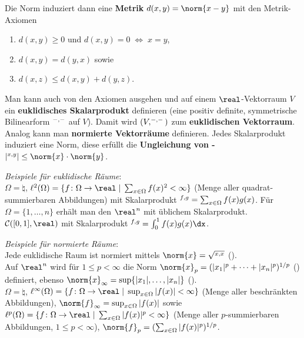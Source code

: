 Die Norm induziert dann eine \textbf{Metrik} $d(x, y) = \norm{x - y}$ mit den
Metrik-Axiomen
\begin{enumerate}[label=(M\arabic*)]
    \item
    $d(x, y) \ge 0$ und $d(x, y) = 0 \;\Leftrightarrow\; x = y$,

    \item
    $d(x, y) = d(y, x)$ sowie

    \item
    $d(x, z) \le d(x, y) + d(y, z)$.
\end{enumerate}

Man kann auch von den Axiomen ausgehen und auf einem $\real$-Vektorraum $V$ ein
\textbf{euklidisches Skalarprodukt} definieren
(eine positiv definite, symmetrische Bilinearform $\sp{-, -}$ auf $V$).
Damit wird $(V, \sp{-, -})$ zum \textbf{euklidischen Vektorraum}. \\
Analog kann man \textbf{normierte Vektorräume} definieren. Jedes Skalarprodukt
induziert eine Norm, diese erfüllt die
\textbf{Ungleichung von -}
$|\sp{x, y}| \le \norm{x} \cdot \norm{y}$.

\emph{Beispiele für euklidische Räume}: \\
$\Omega = \natural$,
$\ell^2(\Omega) = \{f\colon \Omega \rightarrow \real \;|\;
\sum_{x \in \Omega} f(x)^2 < \infty\}$
(Menge aller quadrat-summierbaren Abbildungen)
mit Skalarprodukt
$\sp{f, g} = \sum_{x \in \Omega} f(x)g(x)$.
Für $\Omega = \{1, \dotsc, n\}$ erhält man den
$\real^n$ mit üblichem Skalarprodukt. \\
$\C([0,1], \real)$ mit Skalarprodukt $\sp{f, g} = \int_0^1 f(x)g(x)\dx$.

\emph{Beispiele für normierte Räume}: \\
Jede euklidische Raum ist normiert mittels $\norm{x} = \sqrt{\sp{x, x}}$
(). \\
Auf $\real^n$ wird für $1 \le p < \infty$ die Norm
$\norm{x}_p = (|x_1|^p + \dotsb + |x_n|^p)^{1/p}$ ()
definiert, ebenso $\norm{x}_\infty = \sup\{|x_1|, \dotsc, |x_n|\}$
(). \\
$\Omega = \natural$,
$\ell^\infty(\Omega) = \{f\colon \Omega \rightarrow \real \;|\;
\sup_{x \in \Omega} |f(x)| < \infty\}$
(Menge aller beschränkten Abbildungen),
$\norm{f}_\infty = \sup_{x \in \Omega} |f(x)|$ sowie
$\ell^p(\Omega) = \{f\colon \Omega \rightarrow \real \;|\;
\sum_{x \in \Omega} |f(x)|^p < \infty\}$
(Menge aller $p$-summierbaren Abbildungen, $1 \le p < \infty$),
$\norm{f}_p = (\sum_{x \in \Omega} |f(x)|^p)^{1/p}$.

